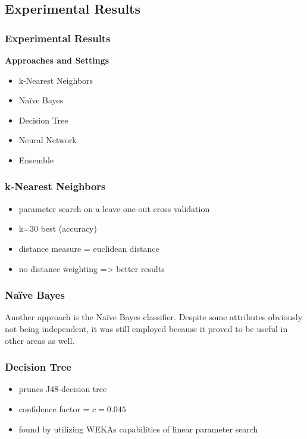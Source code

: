 \mode*
\begin{frame}
 	\section{Experimental Results}
 	\frametitle{Experimental Results}
 	\onslide<+->
	\textbf{Approaches and Settings}
	\begin{itemize}
		\item<+-> k-Nearest Neighbors
		\item<+-> Na\"ive Bayes
		\item<+-> Decision Tree
		\item<+-> Neural Network
		\item<+-> Ensemble
	\end{itemize}
\end{frame}

\begin{frame}
	\frametitle{k-Nearest Neighbors}
	\onslide<+->
	\begin{itemize}
		\item<+-> parameter search on a leave-one-out cross validation
		\item<+-> k=30 best (accuracy)
		\item<+-> distance measure = euclidean distance
		\item<+-> no distance weighting => better results
	\end{itemize}
\end{frame}

\begin{frame}
	\frametitle{Na\"ive Bayes}
	Another approach is the Na\"ive Bayes classifier. Despite some
	attributes obviously not being independent, it was still employed
	because it proved to be useful in other areas as well.
\end{frame}

\begin{frame}[fragile]
	\frametitle{Decision Tree}
	\onslide<+->
	\begin{itemize}
		\item<+-> prunes J48-decision tree
		\item<+-> confidence factor =  \(c=0.045\)
		\item<+-> found by utilizing WEKAs capabilities of linear
		parameter search
	\end{itemize}
\end{frame}

